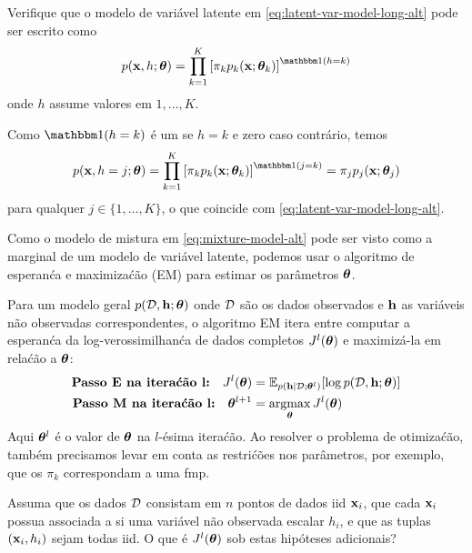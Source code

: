\begin{exenumerate}
    \item Verifique que o modelo de vari\'avel latente em \eqref{eq:latent-var-model-long-alt} pode ser escrito como
    \begin{equation}
        p(\x, h; \thetab) = \prod_{k=1}^K \left[  \pi_k  p_k(\x; \thetab_k) \right]^{\ind(h=k)}
        \label{eq:latent-var-model-alt}
    \end{equation}
    onde $h$ assume valores em $1, \ldots, K$.
    
    \begin{solution}
        Como $\ind(h=k)$ \'e um se $h=k$ e zero caso contr\'ario, temos
        \begin{equation}
            p(\x, h=j; \thetab) =  \prod_{k=1}^K \left[  \pi_k  p_k(\x; \thetab_k) \right]^{\ind(j=k)} = \pi_j p_j(\x ; \thetab_j)
        \end{equation}
        para qualquer $j \in \{1, \ldots, K\}$, o que coincide com
        \eqref{eq:latent-var-model-long-alt}.
    \end{solution}
    
    \item Como o modelo de mistura em \eqref{eq:mixture-model-alt} pode ser visto como a
    marginal de um modelo de vari\'avel latente, podemos usar o algoritmo de esperan\'ca e maximiza\'c\~ao
    (EM) para estimar os par\^ametros $\boldsymbol{\theta}$.
    
    Para um modelo geral $p(\mathcal{D},\mathbf{h}; \boldsymbol{\theta})$ onde $\mathcal{D}$ s\~ao os dados observados
    e $\mathbf{h}$ as vari\'aveis n\~ao observadas correspondentes, o algoritmo EM itera entre
    computar a esperan\'ca da log-verossimilhan\'ca de dados completos $J^l(\boldsymbol{\theta})$ e maximiz\'a-la em rela\'c\~ao a $\boldsymbol{\theta}$: 
    \begin{align}
        \textbf{Passo E na itera\'c\~ao l:}\quad J^l(\boldsymbol{\theta}) &= \mathbb{E}_{p(\mathbf{h} | \mathcal{D}; \boldsymbol{\theta}^l)} [ \log p(\mathcal{D},\mathbf{h}; \boldsymbol{\theta})]\\
        \textbf{Passo M na itera\'c\~ao l:}\quad \boldsymbol{\theta}^{l+1} &= \operatorname*{\mathrm{argmax}}_{\boldsymbol{\theta}} J^l(\boldsymbol{\theta}) 
    \end{align}
    Aqui $\boldsymbol{\theta}^l$ \'e o valor de $\boldsymbol{\theta}$ na $l$-\'esima itera\'c\~ao. Ao
    resolver o problema de otimiza\'c\~ao, tamb\'em precisamos levar em conta as
    restri\'c\~oes nos par\^ametros, por exemplo, que os $\pi_k$ correspondam a uma fmp.
    
    Assuma que os dados $\mathcal{D}$ consistam em $n$ pontos de dados iid $\mathbf{x}_i$,
    que cada $\mathbf{x}_i$ possua associada a si uma vari\'avel n\~ao observada escalar $h_i$,
    e que as tuplas $(\mathbf{x}_i, h_i)$ sejam todas iid. O que \'e $J^l(\boldsymbol{\theta})$ sob
    estas hip\'oteses adicionais?
    

\end{exenumerate}
